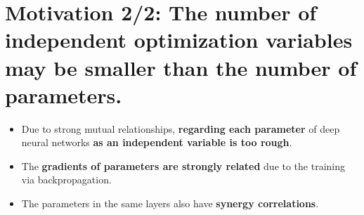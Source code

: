 \documentclass[t]{beamer}
\begin{document}
\section{Motivation 2/2: The number of independent optimization variables may be smaller than the number of parameters.}
\begin{frame}
\begin{itemize}
\item Due to strong mutual relationships, \textbf{regarding each parameter} of deep neural networks \textbf{as an independent variable is too rough}. \vspace{0.3cm}
\item The \textbf{gradients of parameters are strongly related} due to the training via backpropagation. \vspace{0.4cm}
\item The parameters in the same layers also have \textbf{synergy correlations}. \vspace{0.8cm}
\end{itemize}
\center{$\Downarrow$} \vspace{0.8cm}
\begin{center}
\end{center}
\end{frame}




\end{document}
